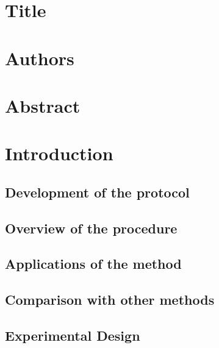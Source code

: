 \documentclass[12pt]{article}
\begin{document}
\section*{Title}




\section*{Authors}





\section*{Abstract}





\section*{Introduction}





\subsection*{Development of the protocol}





\subsection*{Overview of the procedure}





\subsection*{Applications of the method}





\subsection*{Comparison with other methods}





\subsection*{Experimental Design}
\end{document}
